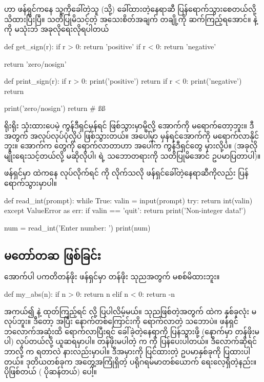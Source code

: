 \section{}
 ဟာ ဖန်ရှင်ကနေ သူ့ကိုခေါ်တဲ့သူ (သို့) ခေါ်ထားတဲ့နေရာဆီ ပြန်ရောက်သွားစေတယ်လို့ သိထားပြီးပြီ။ သတိပြုမိသင့်တဲ့ အသေးစိတ်အချက် တချို့ကို ဆက်ကြည့်ရအောင်။  နဲ့  ကို   မသုံးဘဲ အခုလိုရေးလိုရပါတယ်
%
\begin{py}
def get_sign(r):
    if r > 0:
        return 'positive'
    if r < 0:
        return 'negative'

    return 'zero/nosign'

def print_sign(r):
    if r > 0:
        print('positive')
        return
    if r < 0:
        print('negative')
        return

    print('zero/nosign')
    return # ßß
\end{py}
%
ရိုးရိုး  သုံးထားပေမဲ့ ကွန်ဒီရှင်မှန်ရင်  ဖြစ်သွားမှာမို့လို့ အောက်ကို မရောက်တော့ဘူး။ ဒီအတွက်   အလုပ်လုပ်ပုံလိုပဲ ဖြစ်သွားတယ်။ အပေါ်မှာ မှန်ရင်အောက်ကို မရောက်လာနိုင်ဘူး။ အောက်က  တွေကို ရောက်လာတာဟာ အပေါ်က ကွန်ဒီရှင်တွေ မှားလို့ပဲ။ (အခုလိုမျိုးရေးသင့်တယ်လို့ မဆိုလိုပါ၊  ရဲ့ သဘောတရားကို သတိပြုမိအောင် ဥပမာပြတာပါ)။


ဖန်ရှင်မှာ  ထဲကနေ  လုပ်လိုက်ရင်  ကို  လိုက်သလို ဖန်ရှင်ခေါ်တဲ့နေရာဆီကိုလည်း ပြန်ရောက်သွားမှာပါ။
%
\begin{py}
def read_int(prompt):
    while True:
        valin = input(prompt)
        try:
            return int(valin)
        except ValueError as err:
            if valin == 'quit':
                return
            print('Non-integer data!')


num = read_int('Enter number: ')
print(num)
\end{py}
%

\subsection*{မတော်တဆ  ဖြစ်ခြင်း}
အောက်ပါ ပကတိတန်ဖိုး ဖန်ရှင်မှာ  တန်ဖိုး သုညအတွက် မစစ်မိထားဘူး။ 
%
\begin{py}
def my_abs(n):
    if n > 0:
        return n
    elif n < 0:
        return -n
\end{py}
%
အကယ်၍  နဲ့ ထုတ်ကြည့်ရင်  လို့ ပြပါလိမ့်မယ်။  သုညဖြစ်တဲ့အတွက်  ထဲက  နှစ်ခုလုံး  မလုပ်ဘူး။ ဒီတော့  အပြီး နောက်တစ်ကြောင်းကို ရောက်လာတဲ့ သဘောပဲ။ ဖန်ရှင်ဘလောက်အဆုံးထိ ရောက်လာပြီးရင် ခေါ်ခဲ့တဲ့နေရာကို ပြန်သွားဖို့  (နောက်မှာ တန်ဖိုးမပါ) လုပ်တယ်လို့ ယူဆရမှာပါ။ တန်ဖိုးမပါတဲ့  က  ကို ပြန်ပေးပါတယ်။ ဒီလောက်ဆိုရင် ဘာလို့  က  ရတာလဲ နားလည်းမှာပါ။ ဒီအမှားကို ပြင်ထားတဲ့ ဥပမာနှစ်ခုကို ပြထားပါတယ်။ ဒုတိယတစ်ခုက အတွေ့အကြုံရှိတဲ့  ပရိုဂရမ်မာတစ်ယောက် ရေးလေ့ရှိတဲ့နည်း။  ပိုဖြစ်တယ် ( ပိုဆန်တယ်) ပေါ့။

